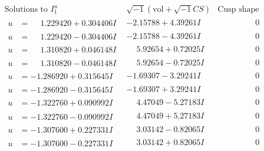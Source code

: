 \documentclass[1p]{elsarticle_modified}
\theoremstyle{definition}
\newcommand{\I}{\sqrt{-1}}
\begin{document}
$$\begin{array}{c|c|c}
\text{Solutions to }I^u_{1}& \I (\text{vol} + \sqrt{-1}CS) & \text{Cusp shape}\\
 \hline 
\begin{aligned}
u &= \phantom{-}1.229420 + 0.304406 I\end{aligned}
 & -2.15788 + 4.39261 I & \phantom{-0.000000 } 0 \\ \hline\begin{aligned}
u &= \phantom{-}1.229420 - 0.304406 I\end{aligned}
 & -2.15788 - 4.39261 I & \phantom{-0.000000 } 0 \\ \hline\begin{aligned}
u &= \phantom{-}1.310820 + 0.046148 I\end{aligned}
 & \phantom{-}5.92654 + 0.72025 I & \phantom{-0.000000 } 0 \\ \hline\begin{aligned}
u &= \phantom{-}1.310820 - 0.046148 I\end{aligned}
 & \phantom{-}5.92654 - 0.72025 I & \phantom{-0.000000 } 0 \\ \hline\begin{aligned}
u &= -1.286920 + 0.315645 I\end{aligned}
 & -1.69307 - 3.29241 I & \phantom{-0.000000 } 0 \\ \hline\begin{aligned}
u &= -1.286920 - 0.315645 I\end{aligned}
 & -1.69307 + 3.29241 I & \phantom{-0.000000 } 0 \\ \hline\begin{aligned}
u &= -1.322760 + 0.090992 I\end{aligned}
 & \phantom{-}4.47049 - 5.27183 I & \phantom{-0.000000 } 0 \\ \hline\begin{aligned}
u &= -1.322760 - 0.090992 I\end{aligned}
 & \phantom{-}4.47049 + 5.27183 I & \phantom{-0.000000 } 0 \\ \hline\begin{aligned}
u &= -1.307600 + 0.227331 I\end{aligned}
 & \phantom{-}3.03142 - 0.82065 I & \phantom{-0.000000 } 0 \\ \hline\begin{aligned}
u &= -1.307600 - 0.227331 I\end{aligned}
 & \phantom{-}3.03142 + 0.82065 I & \phantom{-0.000000 } 0 \\ \hline\begin{aligned}

\end{aligned}
\end{array}$$
\end{document}
